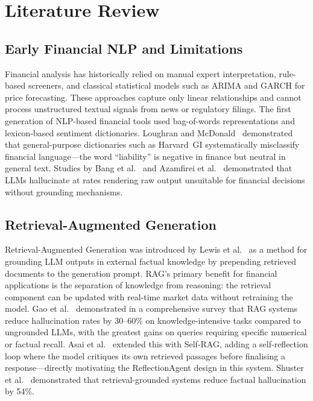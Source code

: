 \documentclass[10pt,journal,compsoc]{IEEEtran}
\begin{document}
\section{Literature Review}
\label{sec:lit}

\subsection{Early Financial NLP and Limitations}

Financial analysis has historically relied on manual expert
interpretation, rule-based screeners, and classical statistical models
such as ARIMA and GARCH for price forecasting.
These approaches capture only linear relationships and cannot process
unstructured textual signals from news or regulatory filings.
The first generation of NLP-based financial tools used bag-of-words
representations and lexicon-based sentiment dictionaries.
Loughran and McDonald~\cite{loughran2011} demonstrated that
general-purpose dictionaries such as Harvard~GI systematically
misclassify financial language---the word ``liability'' is negative in
finance but neutral in general text.
Studies by Bang et al.~\cite{bang2023} and Azamfirei et al.~\cite{azamfirei2023} demonstrated that LLMs hallucinate at rates
rendering raw output unsuitable for financial decisions without
grounding mechanisms.

\subsection{Retrieval-Augmented Generation}

Retrieval-Augmented Generation was introduced by Lewis et al.~\cite{lewis2020rag} as a method for grounding LLM outputs in external
factual knowledge by prepending retrieved documents to the generation
prompt.
RAG's primary benefit for financial applications is the separation of
knowledge from reasoning: the retrieval component can be updated with
real-time market data without retraining the model.
Gao et al.~\cite{gao2023rag} demonstrated in a comprehensive survey
that RAG systems reduce hallucination rates by 30--60\% on
knowledge-intensive tasks compared to ungrounded LLMs, with the
greatest gains on queries requiring specific numerical or factual
recall.
Asai et al.~\cite{asai2023selfrag} extended this with Self-RAG,
adding a self-reflection loop where the model critiques its own
retrieved passages before finalising a response---directly motivating
the ReflectionAgent design in this system.
Shuster et al.~\cite{shuster2021} demonstrated that
retrieval-grounded systems reduce factual hallucination by 54\%.
\end{document}
